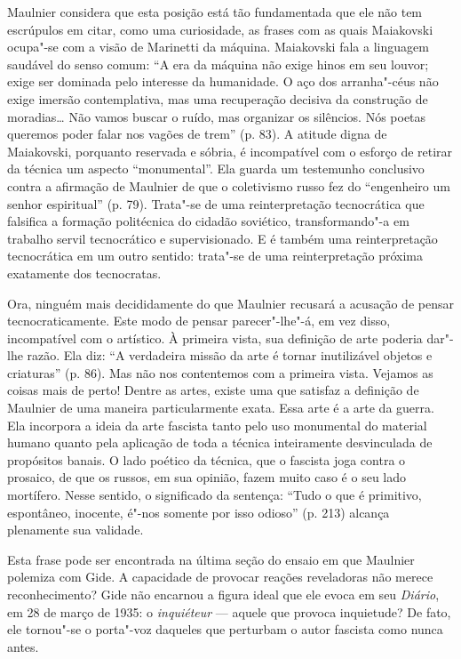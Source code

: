 Maulnier considera que esta posição está tão fundamentada que ele não
tem escrúpulos em citar, como uma curiosidade, as frases com as quais
Maiakovski ocupa"-se com a visão de Marinetti da máquina. Maiakovski fala
a linguagem saudável do senso comum: ``A era da máquina não exige hinos
em seu louvor; exige ser dominada pelo interesse da humanidade. O aço
dos arranha"-céus não exige imersão contemplativa, mas uma recuperação
decisiva da construção de moradias\ldots{} Não vamos buscar o ruído, mas
organizar os silêncios. Nós poetas queremos poder falar nos vagões de
trem'' (p. 83). A atitude digna de Maiakovski, porquanto reservada e
sóbria, é incompatível com o esforço de retirar da técnica um aspecto
``monumental''. Ela guarda um testemunho conclusivo contra a afirmação
de Maulnier de que o coletivismo russo fez do ``engenheiro um senhor
espiritual'' (p. 79). Trata"-se de uma reinterpretação tecnocrática que
falsifica a formação politécnica do cidadão soviético,
transformando"-a em trabalho servil tecnocrático e supervisionado.
E é também uma reinterpretação tecnocrática em um outro sentido: trata"-se de
uma reinterpretação próxima exatamente dos tecnocratas.

Ora, ninguém mais decididamente do que Maulnier recusará a acusação de
pensar tecnocraticamente. Este modo de pensar parecer"-lhe"-á, em vez
disso, incompatível com o artístico. À primeira vista, sua definição de
arte poderia dar"-lhe razão. Ela diz: ``A verdadeira missão da arte é
tornar inutilizável objetos e criaturas'' (p. 86). Mas não nos
contentemos com a primeira vista. Vejamos as coisas mais de perto!
Dentre as artes, existe uma que satisfaz a definição de Maulnier de uma
maneira particularmente exata. Essa arte é a arte da guerra. Ela
incorpora a ideia da arte fascista tanto pelo uso monumental do material
humano quanto pela aplicação de toda a técnica inteiramente desvinculada
de propósitos banais. O lado poético da técnica, que o fascista joga
contra o prosaico, de que os russos, em sua opinião, fazem muito caso é
o seu lado mortífero. Nesse sentido, o significado da sentença: ``Tudo o
que é primitivo, espontâneo, inocente, é"-nos somente por isso odioso''
(p. 213) alcança plenamente sua validade.

Esta frase pode ser encontrada na última seção do ensaio em que Maulnier
polemiza com Gide. A capacidade de provocar reações reveladoras não
merece reconhecimento? Gide não encarnou a figura ideal que ele evoca em
seu \emph{Diário}, em 28 de março de 1935: o \emph{inquiéteur} --- aquele
que provoca inquietude? De fato, ele tornou"-se o porta"-voz daqueles que
perturbam o autor fascista como nunca antes.

